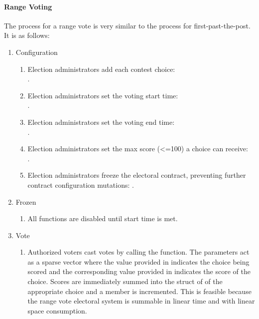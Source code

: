 \paragraph{Range Voting}
The process for a range vote is very similar to the process for
first-past-the-post. It is as follows:

\begin{enumerate}
  \item Configuration
  \begin{enumerate}
    \item Election administrators add each contest choice: \\
      .
    \item Election administrators set the voting start time: \\
      .
    \item Election administrators set the voting end time: \\
      .
    \item Election administrators set the max score (<=100) a choice can
      receive: \\
      .
    \item Election administrators freeze the electoral contract, preventing
      further contract configuration mutations: .
  \end{enumerate}

  \item Frozen
  \begin{enumerate}
    \item All functions are disabled until start time is met.
  \end{enumerate}

  \item Vote
  \begin{enumerate}
    \item Authorized voters cast votes by calling the 
      function. The parameters act as a sparse vector where the value
      provided in  indicates the choice being scored
      and the corresponding value provided in 
      indicates the score of the choice. Scores are immediately summed
      into the struct of of the appropriate choice and a
       member is incremented. This is feasible
      because the range vote electoral system is summable in linear time
      and with linear space consumption.
  \end{enumerate}


\end{enumerate}
